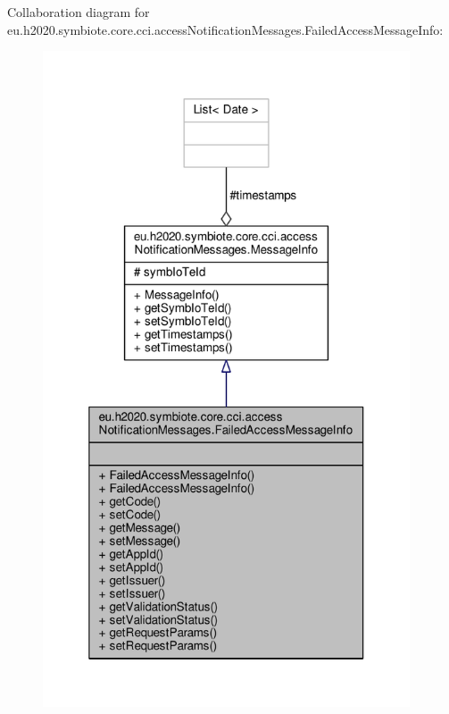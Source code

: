 Collaboration diagram for eu.\+h2020.\+symbiote.\+core.\+cci.\+access\+Notification\+Messages.\+Failed\+Access\+Message\+Info\+:
\nopagebreak
\begin{figure}[H]
\begin{center}
\leavevmode
\includegraphics[width=308pt]{classeu_1_1h2020_1_1symbiote_1_1core_1_1cci_1_1accessNotificationMessages_1_1FailedAccessMessageInfo__coll__graph}
\end{center}
\end{figure}
